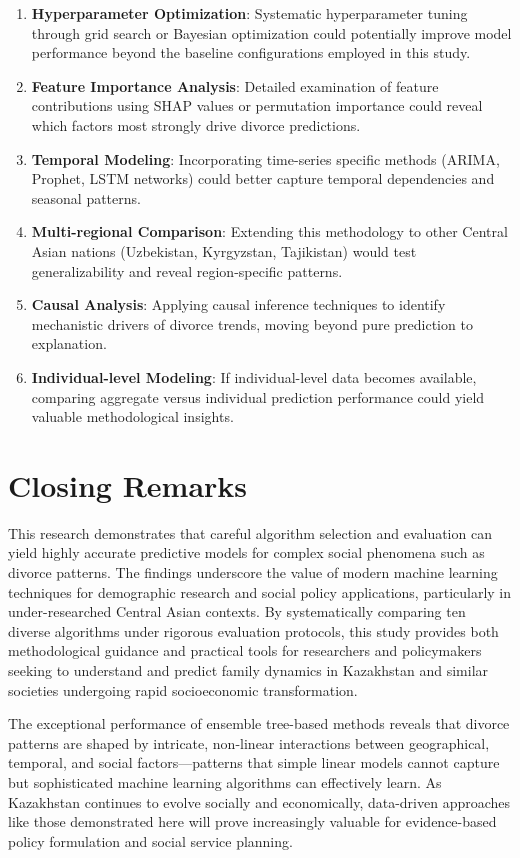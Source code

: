 \begin{enumerate}
    \item \textbf{Hyperparameter Optimization}: Systematic hyperparameter tuning through grid search or Bayesian optimization could potentially improve model performance beyond the baseline configurations employed in this study.
    
    \item \textbf{Feature Importance Analysis}: Detailed examination of feature contributions using SHAP values or permutation importance could reveal which factors most strongly drive divorce predictions.
    
    \item \textbf{Temporal Modeling}: Incorporating time-series specific methods (ARIMA, Prophet, LSTM networks) could better capture temporal dependencies and seasonal patterns.
    
    \item \textbf{Multi-regional Comparison}: Extending this methodology to other Central Asian nations (Uzbekistan, Kyrgyzstan, Tajikistan) would test generalizability and reveal region-specific patterns.
    
    \item \textbf{Causal Analysis}: Applying causal inference techniques to identify mechanistic drivers of divorce trends, moving beyond pure prediction to explanation.
    
    \item \textbf{Individual-level Modeling}: If individual-level data becomes available, comparing aggregate versus individual prediction performance could yield valuable methodological insights.
\end{enumerate}

\section{Closing Remarks}

This research demonstrates that careful algorithm selection and evaluation can yield highly accurate predictive models for complex social phenomena such as divorce patterns. The findings underscore the value of modern machine learning techniques for demographic research and social policy applications, particularly in under-researched Central Asian contexts. By systematically comparing ten diverse algorithms under rigorous evaluation protocols, this study provides both methodological guidance and practical tools for researchers and policymakers seeking to understand and predict family dynamics in Kazakhstan and similar societies undergoing rapid socioeconomic transformation.

The exceptional performance of ensemble tree-based methods reveals that divorce patterns are shaped by intricate, non-linear interactions between geographical, temporal, and social factors—patterns that simple linear models cannot capture but sophisticated machine learning algorithms can effectively learn. As Kazakhstan continues to evolve socially and economically, data-driven approaches like those demonstrated here will prove increasingly valuable for evidence-based policy formulation and social service planning.
